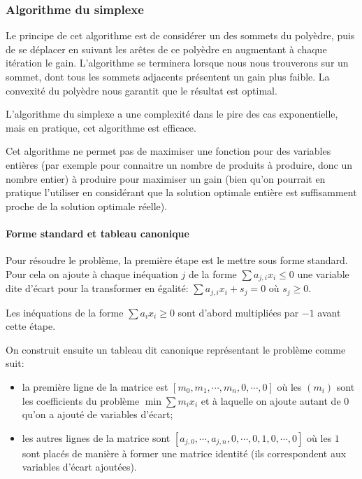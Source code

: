   \subsubsection{Algorithme du simplexe}
    Le principe de cet algorithme est de considérer un des sommets du polyèdre,
    puis de se déplacer en suivant les arêtes de ce polyèdre en augmentant à
    chaque itération le gain. L'algorithme se terminera lorsque nous nous 
    trouverons sur un sommet, dont tous les sommets adjacents présentent un gain
    plus faible. La convexité du polyèdre nous garantit que le résultat est 
    optimal.

    L'algorithme du simplexe a une complexité dans le pire des cas
    exponentielle, mais en pratique, cet algorithme est efficace.
    
    Cet algorithme ne permet pas de maximiser une fonction pour des variables
    entières (par exemple pour connaitre un nombre de produits à produire, donc
    un nombre entier) à produire pour maximiser un gain (bien qu'on pourrait en
    pratique l'utiliser en considérant que la solution optimale entière est
    suffisamment proche de la solution optimale réelle).

    \paragraph{Forme standard et tableau canonique}
      Pour résoudre le problème, la première étape est le mettre sous forme
      standard. Pour cela on ajoute à chaque inéquation $j$ de la forme
      $\sum a_{j,i}x_i \leq 0$ une variable dite d'écart pour la transformer en
      égalité: $\sum a_{j,i}x_i + s_j = 0$ où $s_j \geq 0$.
      
      Les inéquations de la forme $\sum a_ix_i \geq 0$ sont d'abord multipliées
      par $-1$ avant cette étape.

      On construit ensuite un tableau dit canonique représentant le problème
      comme suit:
      \begin{itemize}
        \item la première ligne de la matrice est
          $[m_0, m_1, \cdots, m_n, 0, \cdots, 0]$ où les $(m_i)$ sont les
          coefficients du problème $\min \sum m_ix_i$ et à laquelle on ajoute
          autant de $0$ qu'on a ajouté de variables d'écart;
        \item les autres lignes de la matrice sont
          $[a_{j,0}, \cdots, a_{j,n}, 0, \cdots, 0, 1,0, \cdots, 0]$ où les $1$
          sont placés de manière à former une matrice identité (ils
          correspondent aux variables d'écart ajoutées).
      \end{itemize}

